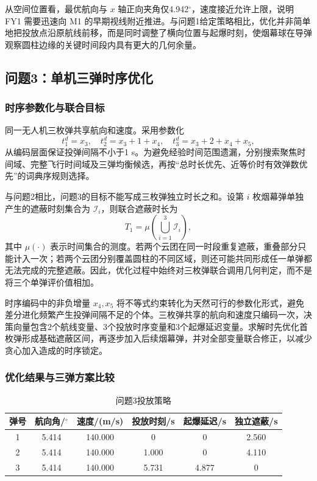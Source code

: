 \documentclass[12pt,a4paper]{ctexart}
\begin{document}
从空间位置看，最优航向与 $x$ 轴正向夹角仅4.942$^\circ$，速度接近允许上限，说明 FY1 需要迅速向 M1 的早期视线附近推进。与问题1给定策略相比，优化并非简单地把投放点沿原航线前移，而是同时调整了横向位置与起爆时刻，使烟幕球在导弹观察圆柱边缘的关键时间段内具有更大的几何余量。

\subsection{问题3：单机三弹时序优化}

\subsubsection{时序参数化与联合目标}

同一无人机三枚弹共享航向和速度。采用参数化
\begin{equation}
t_1^d=x_3,\quad
t_2^d=x_3+1+x_4,\quad
t_3^d=x_3+2+x_4+x_5,
\end{equation}
从编码层面保证投弹间隔不小于1 s。为避免经验时间范围遗漏，分别搜索聚焦时间域、完整飞行时间域及三弹均衡候选，再按“总时长优先、近等价时有效弹数优先”的词典序规则选择。

与问题2相比，问题3的目标不能写成三枚弹独立时长之和。设第 $i$ 枚烟幕弹单独产生的遮蔽时刻集合为 $\mathcal I_i$，则联合遮蔽时长为
\begin{equation}
T_1=\mu\!\left(\bigcup_{i=1}^{3}\mathcal I_i\right),
\end{equation}
其中 $\mu(\cdot)$ 表示时间集合的测度。若两个云团在同一时段重复遮蔽，重叠部分只能计入一次；若两个云团分别覆盖圆柱的不同区域，则还可能共同形成任一单弹都无法完成的完整遮蔽。因此，优化过程中始终对三枚弹联合调用几何判定，而不是将三个单弹评价值相加。

时序编码中的非负增量 $x_4,x_5$ 将不等式约束转化为天然可行的参数化形式，避免差分进化频繁产生投弹间隔不足的个体。三枚弹共享的航向和速度只编码一次，决策向量包含2个航线变量、3个投放时序变量和3个起爆延迟变量。求解时先优化首枚弹形成基础遮蔽区间，再逐步加入后续烟幕弹，并对全部变量联合修正，以减少贪心加入造成的时序锁定。

\subsubsection{优化结果与三弹方案比较}

\begin{table}[H]
\centering
\caption{问题3投放策略}
\begin{tabular}{cccccc}
\toprule
弹号 & 航向角/$^\circ$ & 速度/(m/s) & 投放时刻/s & 起爆延迟/s & 独立遮蔽/s\\
\midrule
1 & 5.414 & 140.000 & 0 & 0 & 2.560\\
2 & 5.414 & 140.000 & 1.000 & 0 & 4.110\\
3 & 5.414 & 140.000 & 5.731 & 4.877 & 0\\
\bottomrule
\end{tabular}
\end{table}
\end{document}
